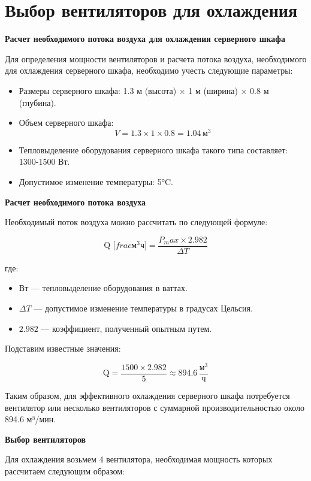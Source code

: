 \section {Выбор вентиляторов для охлаждения}

\textbf{Расчет необходимого потока воздуха для охлаждения серверного шкафа}

Для определения мощности вентиляторов и расчета потока воздуха, необходимого для охлаждения серверного шкафа, необходимо учесть следующие параметры:

\begin{itemize}
    \item Размеры серверного шкафа: 1.3 м (высота) $\times$ 1 м (ширина) $\times$ 0.8 м (глубина).
    \item Объем серверного шкафа: 
    \[
    V = 1.3 \times 1 \times 0.8 = 1.04 \, \text{м}^3
    \]
    \item Тепловыделение оборудования серверного шкафа такого типа составляет: 1300-1500 Вт.
    \item Допустимое изменение температуры: 5°C.
\end{itemize}

\textbf{Расчет необходимого потока воздуха}

Необходимый поток воздуха можно рассчитать по следующей формуле:

\[
\text{Q [}frac{\text{м}^3}{\text{ч}}\text{]} = \frac{P_max \times 2.982}{\Delta T}
\]

где:
\begin{itemize}
    \item Вт — тепловыделение оборудования в ваттах.
    \item $\Delta T$ — допустимое изменение температуры в градусах Цельсия.
    \item $2.982$ — коэффициент, полученный опытным путем.
\end{itemize}

Подставим известные значения:

\[
\text{Q} = \frac{1500 \times 2.982}{5} \approx 894.6 \, \frac{\text{м}^3}{\text{ч}}
\]

Таким образом, для эффективного охлаждения серверного шкафа потребуется вентилятор или несколько вентиляторов с суммарной производительностью около 894.6 м³/мин.

\textbf{Выбор вентиляторов}

Для охлаждения возьмем 4 вентилятора, необходимая мощность которых рассчитаем следующим образом:

